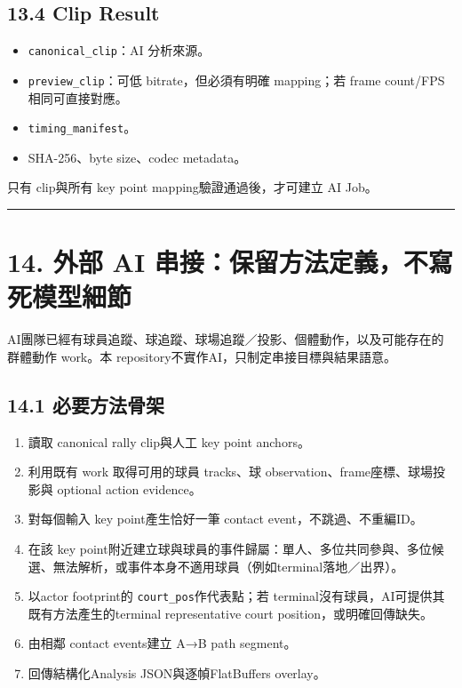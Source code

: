 \documentclass[
  9pt,
  a4paper,
]{article}
\providecommand{\tightlist}{%
  \setlength{\itemsep}{0pt}\setlength{\parskip}{0pt}}
\begin{document}
\subsection{13.4 Clip Result}\label{134-clip-result}

\begin{itemize}
\tightlist
\item
  \texttt{canonical\_\allowbreak{}clip}：AI 分析來源。
\item
  \texttt{preview\_\allowbreak{}clip}：可低 bitrate，但必須有明確 mapping；若 frame
  count/FPS相同可直接對應。
\item
  \texttt{timing\_\allowbreak{}manifest}。
\item
  SHA-256、byte size、codec metadata。
\end{itemize}

只有 clip與所有 key point mapping驗證通過後，才可建立 AI Job。

\begin{center}\rule{0.5\linewidth}{0.5pt}\end{center}

\section{14. 外部 AI
串接：保留方法定義，不寫死模型細節}\label{14-ux5916ux90e8-ai-ux4e32ux63a5ux4fddux7559ux65b9ux6cd5ux5b9aux7fa9ux4e0dux5bebux6b7bux6a21ux578bux7d30ux7bc0}

AI團隊已經有球員追蹤、球追蹤、球場追蹤／投影、個體動作，以及可能存在的群體動作
work。本 repository不實作AI，只制定串接目標與結果語意。

\subsection{14.1
必要方法骨架}\label{141-ux5fc5ux8981ux65b9ux6cd5ux9aa8ux67b6}

\begin{enumerate}
\def\labelenumi{\arabic{enumi}.}
\tightlist
\item
  讀取 canonical rally clip與人工 key point anchors。
\item
  利用既有 work 取得可用的球員 tracks、球
  observation、frame座標、球場投影與 optional action evidence。
\item
  對每個輸入 key point產生恰好一筆 contact event，不跳過、不重編ID。
\item
  在該 key
  point附近建立球與球員的事件歸屬：單人、多位共同參與、多位候選、無法解析，或事件本身不適用球員（例如terminal落地／出界）。
\item
  以actor footprint的 \texttt{court\_\allowbreak{}pos}作代表點；若
  terminal沒有球員，AI可提供其既有方法產生的terminal representative
  court position，或明確回傳缺失。
\item
  由相鄰 contact events建立 A→B path segment。
\item
  回傳結構化Analysis JSON與逐幀FlatBuffers overlay。
\end{enumerate}
\end{document}
